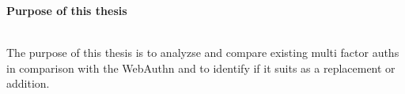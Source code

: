 \thispagestyle{empty}

\begin{large}
	\textbf{Purpose of this thesis} \\ \\
\end{large}
The purpose of this thesis is to analyzse and compare existing multi factor auths in comparison with the WebAuthn and to identify if it suits as a replacement or addition.

\newpage